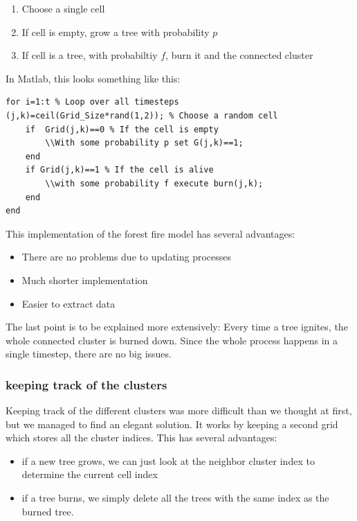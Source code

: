 \documentclass[11pt]{article}
\begin{document}
\begin{enumerate}
\item Choose a single cell
\item If cell is empty, grow a tree with probability $p$
\item If cell is a tree, with probabiltiy $f$, burn it and the connected cluster
\end{enumerate}
In Matlab, this looks something like this:
\begin{verbatim}
for i=1:t % Loop over all timesteps
(j,k)=ceil(Grid_Size*rand(1,2)); % Choose a random cell
	if  Grid(j,k)==0 % If the cell is empty
		\\With some probability p set G(j,k)==1;
	end
	if Grid(j,k)==1 % If the cell is alive
		\\with some probability f execute burn(j,k);
	end
end
\end{verbatim}

This implementation of the forest fire model has several advantages:
\begin{itemize}
\item There are no problems due to updating processes
\item Much shorter implementation
\item Easier to extract data
\end{itemize}
The last point is to be explained more extensively: Every time a tree ignites, the whole connected cluster is burned down. Since the whole process happens in a single timestep, there are no big issues.

\subsubsection{keeping track of the clusters}
Keeping track of the different clusters was more difficult than we thought at first, but we managed to find an elegant solution. It works by keeping a second grid which stores all the cluster indices. This has several advantages:
\begin{itemize}
\item if a new tree grows, we can just look at the neighbor cluster index to determine the current cell index
\item if a tree burns, we simply delete all the trees with the same index as the burned tree.
\end {itemize}
\end{document}
